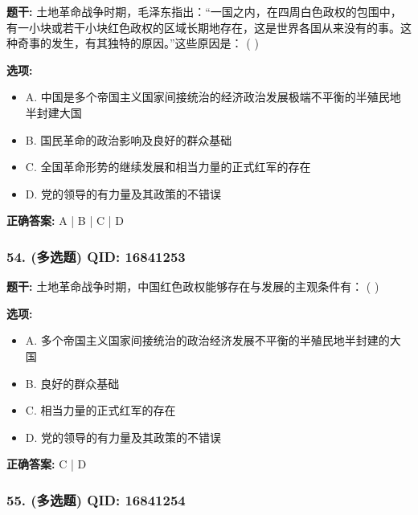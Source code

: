 \documentclass[12pt,UTF8]{ctexart}
\begin{document}
\textbf{题干:}
土地革命战争时期，毛泽东指出：“一国之内，在四周白色政权的包围中，有一小块或若干小块红色政权的区域长期地存在，这是世界各国从来没有的事。这种奇事的发生，有其独特的原因。”这些原因是： ( )

\textbf{选项:}
\begin{itemize}[leftmargin=*]

  \item A. 中国是多个帝国主义国家间接统治的经济政治发展极端不平衡的半殖民地半封建大国

  \item B. 国民革命的政治影响及良好的群众基础

  \item C. 全国革命形势的继续发展和相当力量的正式红军的存在

  \item D. 党的领导的有力量及其政策的不错误

\end{itemize}

\textbf{正确答案:}
A | B | C | D

\vspace{0.3em}\hrulefill\vspace{0.7em}

\subsubsection*{54. (多选题) \small QID: 16841253}

\textbf{题干:}
土地革命战争时期，中国红色政权能够存在与发展的主观条件有： ( )

\textbf{选项:}
\begin{itemize}[leftmargin=*]

  \item A. 多个帝国主义国家间接统治的政治经济发展不平衡的半殖民地半封建的大国

  \item B. 良好的群众基础

  \item C. 相当力量的正式红军的存在

  \item D. 党的领导的有力量及其政策的不错误

\end{itemize}

\textbf{正确答案:}
C | D

\vspace{0.3em}\hrulefill\vspace{0.7em}

\subsubsection*{55. (多选题) \small QID: 16841254}
\end{document}
